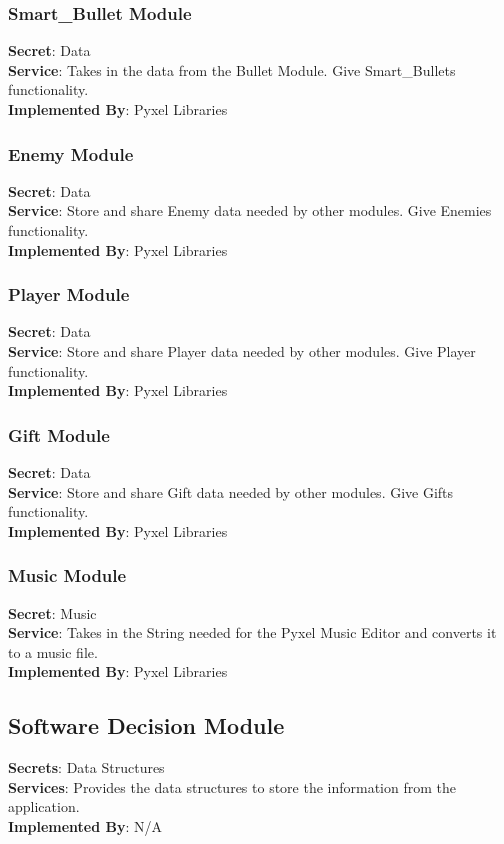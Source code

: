 \documentclass[12,english]{article}
\begin{document}
	\subsubsection{Smart\_Bullet Module}
	\textbf{Secret}: Data \\
	\textbf{Service}: Takes in the data from the Bullet Module. Give Smart\_Bullets functionality. \\
	\textbf{Implemented By}: Pyxel Libraries\\ 
	\subsubsection{Enemy Module}
	\textbf{Secret}: Data \\
	\textbf{Service}: Store and share Enemy data needed by other modules. Give Enemies functionality. \\
	\textbf{Implemented By}: Pyxel Libraries\\
	\subsubsection{Player Module}
	\textbf{Secret}: Data \\
	\textbf{Service}: Store and share Player data needed by other modules. Give Player functionality.\\
	\textbf{Implemented By}: Pyxel Libraries 
	\subsubsection{Gift Module}
	\textbf{Secret}: Data \\
	\textbf{Service}: Store and share Gift data needed by other modules. Give Gifts functionality.\\
	\textbf{Implemented By}: Pyxel Libraries 
	\subsubsection{Music Module}
	\textbf{Secret}: Music \\
	\textbf{Service}: Takes in the String needed for the Pyxel Music Editor and converts it to a music file.\\
	\textbf{Implemented By}: Pyxel Libraries 
	
	\subsection{Software Decision Module}
	\textbf{Secrets}: Data Structures \\
	\textbf{Services}: Provides the data structures to store the information from the application. \\
	\textbf{Implemented By}:  N/A\\
	
\end{document}
